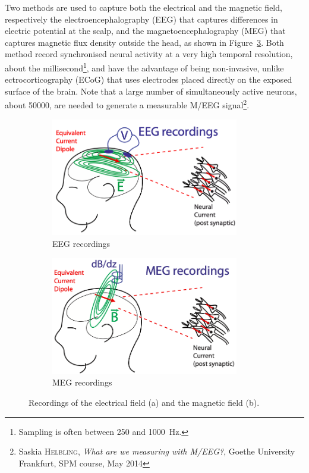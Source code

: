 Two methods are used to capture both the electrical and the magnetic field, respectively the electroencephalography (EEG) that captures differences in electric potential at the scalp, and the magnetoencephalography (MEG) that captures magnetic flux density outside the head, as shown in Figure~\ref{fig:meeg_recordings}.
Both method record synchronised neural activity at a very high temporal resolution, about the millisecond\footnote{Sampling is often between \num{250} and \SI{1000}{\hertz}.}, and have the advantage of being non-invasive, unlike ectrocorticography (ECoG) that uses electrodes placed directly on the exposed surface of the brain.
Note that a large number of simultaneously active neurons, about \num{50000}, are needed to generate a measurable M/EEG signal\footnote{Saskia \textsc{Helbling}, \textit{What are we measuring with M/EEG?}, Goethe University Frankfurt, SPM course, May 2014}.

\begin{figure}
    \centering
    \begin{subfigure}[h]{0.45\textwidth}
        \centering
        \includegraphics[width=0.9\textwidth]{pics/eeg_recordings.png}
        \caption{EEG recordings}
        \label{fig:eeg_recordings}
    \end{subfigure}
    \hfill
    \begin{subfigure}[h]{0.45\textwidth}
        \centering
        \includegraphics[width=0.9\textwidth]{pics/meg_recordings.png}
        \caption{MEG recordings}
        \label{fig:meg_recordings}
    \end{subfigure}
    \caption{Recordings of the electrical field (a) and the magnetic field (b).}
    \label{fig:meeg_recordings}
\end{figure}

